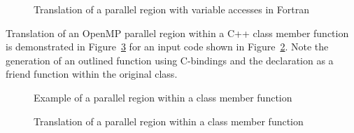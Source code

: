 \begin{figure}[htbp]
{\indent
  {\mySmallFontSize
    \begin{latexonly}
    
    \end{latexonly}
    \begin{htmlonly}
    
    \end{htmlonly}
  }
}
\caption{Translation of a parallel region with variable accesses in Fortran}
\label{Manual:omp:shared-trans-f}
\end{figure}


\clearpage
Translation of an OpenMP parallel region within a C++ class member function is demonstrated in
Figure~\ref{Manual:omp:classMember-trans} for an input code shown in
Figure~\ref{Manual:omp:classMember}. 
Note the generation of an outlined function using C-bindings and the
declaration as a friend function within the original class. 

\lstset{language=C,basicstyle=\scriptsize}
\begin{figure}[htbp]
{\indent
  {\mySmallFontSize
    \begin{latexonly}
    
    \end{latexonly}
    \begin{htmlonly}
    
    \end{htmlonly}
  }
}
\caption{Example of a parallel region within a class member function}
\label{Manual:omp:classMember}
\end{figure}

\begin{figure}[htbp]
{\indent
  {\mySmallFontSize
    \begin{latexonly}
    
    \end{latexonly}
    \begin{htmlonly}
    
    \end{htmlonly}
  }
}
\caption{Translation of a parallel region within a class member function}
\label{Manual:omp:classMember-trans}
\end{figure}



